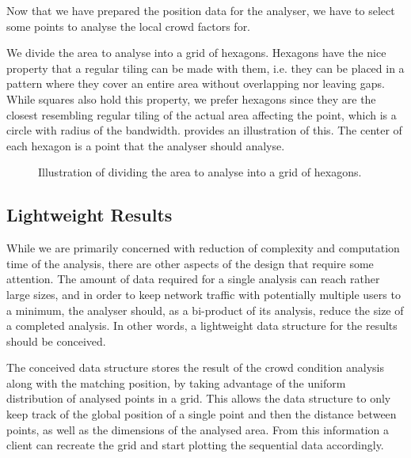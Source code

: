 Now that we have prepared the position data for the analyser, we have to select some points to analyse the local crowd factors for.

We divide the area to analyse into a grid of hexagons. Hexagons have the nice property that a regular tiling can be made with them, i.e. they can be placed in a pattern where they cover an entire area without overlapping nor leaving gaps. While squares also hold this property, we prefer hexagons since they are the closest resembling regular tiling of the actual area affecting the point, which is a circle with radius of the bandwidth.  provides an illustration of this. The center of each hexagon is a point that the analyser should analyse.

\begin{figure}[htbp]
\centering
{}
\caption{Illustration of dividing the area to analyse into a grid of hexagons.}\label{fig:analysis_hexagon_divide}
\end{figure}


\subsection{Lightweight Results}

While we are primarily concerned with reduction of complexity and computation time of the analysis, there are other aspects of the design that require some attention. The amount of data required for a single analysis can reach rather large sizes, and in order to keep network traffic with potentially multiple users to a minimum, the analyser should, as a bi-product of its analysis, reduce the size of a completed analysis. In other words, a lightweight data structure for the results should be conceived. 

The conceived data structure stores the result of the crowd condition analysis along with the matching position, by taking advantage of the uniform distribution of analysed points in a grid. This allows the data structure to only keep track of the global position of a single point and then the distance between points, as well as the dimensions of the analysed area. From this information a client can recreate the grid and start plotting the sequential data accordingly.


